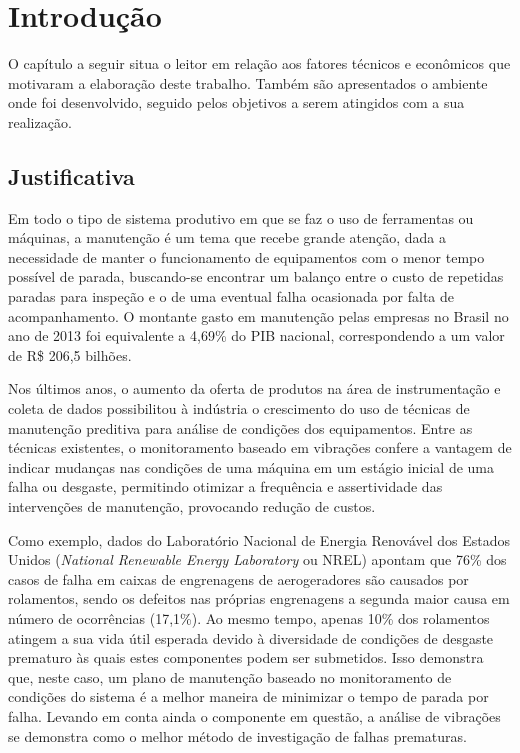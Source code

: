 \documentclass[12pt,openright,twoside,a4paper,
	chapter=TITLE,section=TITLE,
	english,brazil]{abntex2}
\begin{document}
	
	\textual %
	
	\chapter{Introdução}
	O capítulo a seguir situa o leitor em relação aos fatores técnicos e econômicos que motivaram a elaboração deste trabalho. Também são apresentados o ambiente onde foi desenvolvido, seguido pelos objetivos a serem atingidos com a sua realização.
	
	\section{Justificativa}
	Em todo o tipo de sistema produtivo em que se faz o uso de ferramentas ou máquinas, a manutenção é um tema que recebe grande atenção, dada a necessidade de manter o funcionamento de equipamentos com o menor tempo possível de parada, buscando-se encontrar um balanço entre o custo de repetidas paradas para inspeção e o de uma eventual falha ocasionada por falta de acompanhamento. O montante gasto em manutenção pelas empresas no Brasil no ano de 2013 foi equivalente a 4,69\% do PIB nacional, correspondendo a um valor de R\$ 206,5 bilhões\cite{bib:seleme}.
	
	Nos últimos anos, o aumento da oferta de produtos na área de instrumentação e coleta de dados possibilitou à indústria o crescimento do uso de técnicas de manutenção preditiva para análise de condições dos equipamentos. Entre as técnicas existentes, o monitoramento baseado em vibrações confere a vantagem de indicar mudanças nas condições de uma máquina em um estágio inicial de uma falha ou desgaste\cite{bib:al-najjar}, permitindo otimizar a frequência e assertividade das intervenções de manutenção, provocando redução de custos.
	
	Como exemplo, dados do Laboratório Nacional de Energia Renovável dos Estados Unidos (\textit{National Renewable Energy Laboratory} ou NREL) apontam que 76\% dos casos de falha em caixas de engrenagens de aerogeradores são causados por rolamentos, sendo os defeitos nas próprias engrenagens a segunda maior causa em número de ocorrências (17,1\%). Ao mesmo tempo, apenas 10\% dos rolamentos atingem a sua vida útil esperada devido à diversidade de condições de desgaste prematuro às quais estes componentes podem ser submetidos\cite{bib:peeters}. Isso demonstra que, neste caso, um plano de manutenção baseado no monitoramento de condições do sistema é a melhor maneira de minimizar o tempo de parada por falha. Levando em conta ainda o componente em questão, a análise de vibrações se demonstra como o melhor método de investigação de falhas prematuras.
	
\end{document}
